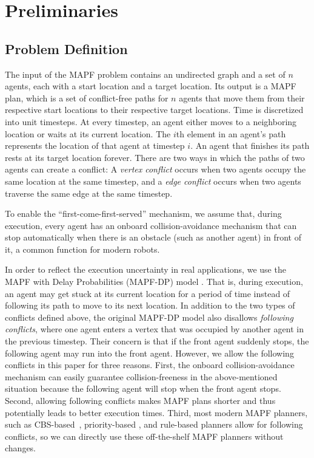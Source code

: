 \documentclass[letterpaper]{article} %
\theoremstyle{definition}
\begin{document}
\section{Preliminaries}
\subsection{Problem Definition}
The input of the MAPF problem \cite{stern_multi-agent_2021} contains an undirected graph and a set of $n$ agents, each with a start location and a target location. Its output is a MAPF plan, which is a set of conflict-free paths for $n$ agents that move them from their respective start locations to their respective target locations. Time is discretized into unit timesteps. At every timestep, an agent either moves to a neighboring location or waits at its current location. The $i$th element in an agent's path represents the location of that agent at timestep $i$. An agent that finishes its path rests at its target location forever. There are two ways in which the paths of two agents can create a conflict: A \emph{vertex conflict} occurs when two agents occupy the same location at the same timestep, and a \emph{edge conflict} occurs when two agents traverse the same edge at the same timestep.


To enable the ``first-come-first-served'' mechanism, we assume that, during execution, every agent has an onboard collision-avoidance mechanism that can stop automatically when there is an obstacle (such as another agent) in front of it, a common function for modern robots.

In order to reflect the execution uncertainty in real applications, we use the MAPF with Delay Probabilities (MAPF-DP) model \cite{ma_multi-agent_2017}. That is, during execution, an agent may get stuck at its current location for a period of time instead of following its path to move to its next location. In addition to the two types of conflicts defined above, the original MAPF-DP model also disallows \emph{following conflicts}, where one agent enters a vertex that was occupied by another agent in the previous timestep. Their concern is that if the front agent suddenly stops, the following agent may run into the front agent. However, we allow the following conflicts in this paper for three reasons. First, the onboard collision-avoidance mechanism can easily guarantee collision-freeness in the above-mentioned situation because the following agent will stop when the front agent stops. Second, allowing following conflicts makes MAPF plans shorter and thus potentially leads to better execution times. Third, most modern MAPF planners, such as CBS-based~\cite{sharon_conflict-based_2015,gange_lazy_2021,li_eecbs_2021}, priority-based \cite{erdmann_multiple_1986,ma_searching_2019}, and rule-based \cite{sajid_multi-agent_2021,okumura_priority_nodate} planners allow for following conflicts, so we can directly use these off-the-shelf MAPF planners without changes.
\end{document}
